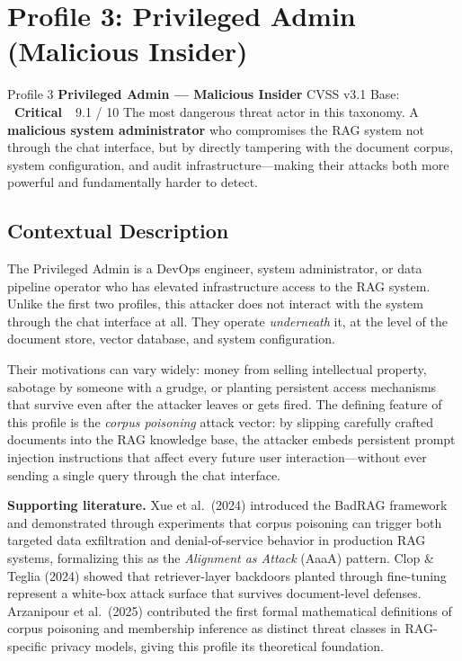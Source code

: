 \documentclass[a4paper,12pt]{report}
\newcommand{\badgecritical}{%
  \colorbox{danger}{\color{white}\small\textbf{~Critical~}}}
\begin{document}
\newpage
\section{Profile 3: Privileged Admin (Malicious Insider)}

\begin{profilebanner}%
  {Profile 3 \enspace\textbf{Privileged Admin --- Malicious Insider}}%
  {CVSS v3.1 Base: \badgecritical\ 9.1 / 10}
  \small
  The most dangerous threat actor in this taxonomy. A \textbf{malicious
  system administrator} who compromises the RAG system not through the
  chat interface, but by directly tampering with the document corpus,
  system configuration, and audit infrastructure---making their attacks
  both more powerful and fundamentally harder to detect.
\end{profilebanner}

\subsection{Contextual Description}

\begin{prosebox}
The Privileged Admin is a DevOps engineer, system administrator, or data
pipeline operator who has elevated infrastructure access to the RAG system.
Unlike the first two profiles, this attacker does not interact with the
system through the chat interface at all. They operate \emph{underneath}
it, at the level of the document store, vector database, and system
configuration.

Their motivations can vary widely: money from selling intellectual property,
sabotage by someone with a grudge, or planting persistent access mechanisms
that survive even after the attacker leaves or gets fired.
The defining feature of this profile is the \emph{corpus poisoning} attack
vector: by slipping carefully crafted documents into the RAG knowledge base,
the attacker embeds persistent prompt injection instructions that affect
every future user interaction---without ever sending a single query through
the chat interface.

\medskip
\textbf{Supporting literature.}
Xue et al.\ (2024) introduced the BadRAG framework and demonstrated through
experiments that corpus poisoning can trigger both targeted data exfiltration
and denial-of-service behavior in production RAG systems, formalizing this as
the \emph{Alignment as Attack} (AaaA) pattern. Clop \& Teglia (2024)
showed that retriever-layer backdoors planted through fine-tuning represent
a white-box attack surface that survives document-level defenses.
Arzanipour et al.\ (2025) contributed the first formal mathematical
definitions of corpus poisoning and membership inference as distinct threat
classes in RAG-specific privacy models, giving this profile its theoretical
foundation.
\end{prosebox}
\end{document}
